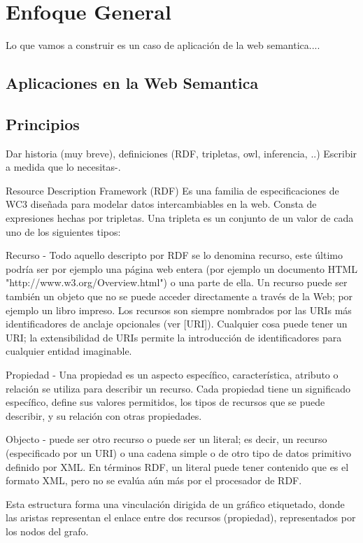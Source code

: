 \chapter{Enfoque General}
\label{chapter:estrategia}

Lo que vamos a construir es un caso de aplicación de la web semantica....

\section{Aplicaciones en la Web Semantica}
\section{Principios}
Dar historia (muy breve), definiciones  (RDF, tripletas, owl, inferencia, ..)
Escribir a medida que lo necesitas-.

Resource Description Framework (RDF)
Es una familia de especificaciones de WC3 diseñada para modelar datos intercambiables en la web. 
Consta de expresiones hechas por tripletas. 
Una tripleta es un conjunto de un valor de cada uno de los siguientes tipos:

Recurso - Todo aquello descripto por RDF se lo denomina recurso, este último podría ser por ejemplo una página web entera (por ejemplo 
un documento HTML "http://www.w3.org/Overview.html") o una parte de ella.  Un recurso puede ser también un objeto que no 
se puede acceder directamente a través de la Web; por ejemplo un libro impreso. Los recursos son siempre nombrados por las 
URIs más identificadores de anclaje opcionales (ver [URI]). Cualquier cosa puede tener un URI; la extensibilidad de URIs 
permite la introducción de identificadores para cualquier entidad imaginable.

Propiedad - Una propiedad es un aspecto específico, característica, atributo o relación se utiliza para describir un recurso. 
Cada propiedad tiene un significado específico, define sus valores permitidos, los tipos de recursos que se puede describir, 
y su relación con otras propiedades. 

Objecto - puede ser otro recurso o puede ser un literal; es decir, un recurso (especificado por un URI) o una cadena simple o 
de otro tipo de datos primitivo definido por XML. En términos RDF, un literal puede tener contenido que es el formato XML,
pero no se evalúa aún más por el procesador de RDF.

Esta estructura forma una vinculación dirigida de un gráfico etiquetado, donde las aristas representan el enlace entre dos 
recursos (propiedad), representados por los nodos del grafo.

